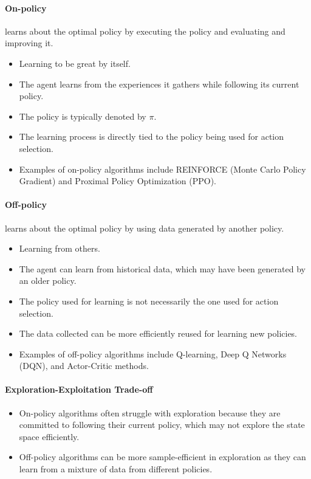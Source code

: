 \paragraph{On-policy} learns about the optimal policy by executing the policy and evaluating and improving it.  
\begin{itemize}
	\item Learning to be great by itself.
	\item The agent learns from the experiences it gathers while following its current policy.
	\item The policy is typically denoted by $\pi$.
	\item The learning process is directly tied to the policy being used for action selection.
	\item Examples of on-policy algorithms include REINFORCE (Monte Carlo Policy Gradient) and Proximal Policy Optimization (PPO).
	\end{itemize}

\paragraph{Off-policy} learns about the optimal policy by using data generated by another policy. 
\begin{itemize}
	\item Learning from others.
	\item The agent can learn from historical data, which may have been generated by an older policy.
	\item The policy used for learning is not necessarily the one used for action selection.
	\item The data collected can be more efficiently reused for learning new policies.
	\item Examples of off-policy algorithms include Q-learning, Deep Q Networks (DQN), and Actor-Critic methods.
\end{itemize}


\paragraph{Exploration-Exploitation Trade-off}
\begin{itemize}
	\item On-policy algorithms often struggle with exploration because they are committed to following their current policy, which may not explore the state space efficiently.
	\item Off-policy algorithms can be more sample-efficient in exploration as they can learn from a mixture of data from different policies.
\end{itemize}

